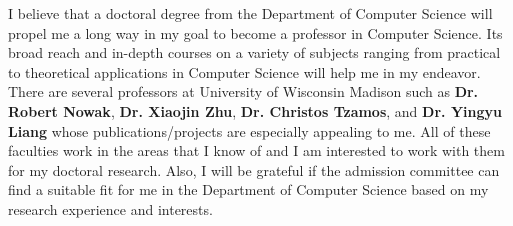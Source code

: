 \documentclass{article}
\begin{document}
I believe that a doctoral degree from the Department of Computer Science will propel me a long way in my goal to become a professor in Computer Science. Its broad reach and in-depth courses on a  variety of subjects ranging from practical to theoretical applications in Computer Science will help me in my endeavor. There are several professors at University of Wisconsin Madison such as \textbf{Dr. Robert Nowak}, \textbf{Dr. Xiaojin Zhu}, \textbf{Dr. Christos Tzamos},  and \textbf{Dr. Yingyu Liang} whose publications/projects are especially appealing to me. All of these faculties work in the areas that I know of and I am interested to work with them for my doctoral research. Also, I will be grateful if the admission committee can find a suitable fit for me in the Department of Computer Science based on my research experience and interests.








\end{document}
